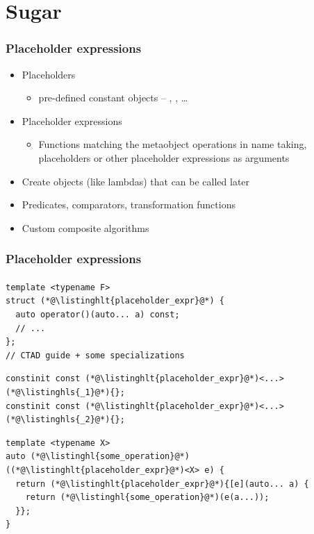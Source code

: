 \documentclass[aspectratio=169,compress,table,xcolor=table]{beamer}
\begin{document}
\section{Sugar}
\begin{frame}
  \frametitle{Placeholder expressions}
  \larger
  \begin{itemize}
    \item Placeholders
    \begin{itemize}
      \item pre-defined constant objects -- , , \ldots
    \end{itemize}
    \item Placeholder expressions
    \begin{itemize}
      \item Functions matching the metaobject operations in name taking,
        placeholders or other placeholder expressions as arguments
    \end{itemize}
    \item Create objects (like lambdas) that can be called later
    \item Predicates, comparators, transformation functions
    \item Custom composite algorithms
  \end{itemize}
\end{frame}
\begin{frame}[fragile]
  \frametitle{Placeholder expressions}
  \framesubtitle{}
  \begin{lstlisting}[language=c++2x,basicstyle=\small\ttfamily]
template <typename F>
struct (*@\listinghlt{placeholder_expr}@*) {
  auto operator()(auto... a) const;
  // ...
};
// CTAD guide + some specializations
  \end{lstlisting}
  \vfill
  \begin{lstlisting}[language=c++2x,basicstyle=\small\ttfamily]
constinit const (*@\listinghlt{placeholder_expr}@*)<...> (*@\listinghls{_1}@*){};
constinit const (*@\listinghlt{placeholder_expr}@*)<...> (*@\listinghls{_2}@*){};
  \end{lstlisting}
  \vfill
  \begin{lstlisting}[language=c++2x,basicstyle=\small\ttfamily]
template <typename X>
auto (*@\listinghl{some_operation}@*)((*@\listinghlt{placeholder_expr}@*)<X> e) {
  return (*@\listinghlt{placeholder_expr}@*){[e](auto... a) {
    return (*@\listinghl{some_operation}@*)(e(a...));
  }};
}
  \end{lstlisting}
\end{frame}
\end{document}
